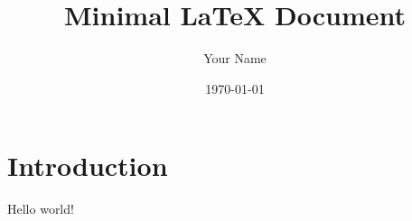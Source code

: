 \documentclass{article}
\title{Minimal LaTeX Document}
\author{Your Name}
\date{\today}
\begin{document}
\maketitle

\section{Introduction}
Hello world!
\end{document}
